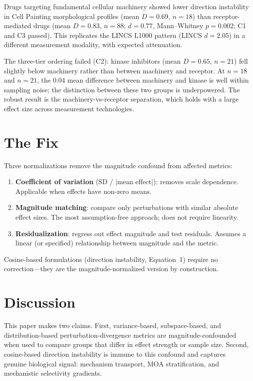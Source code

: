 \documentclass[11pt]{article}
\begin{document}
Drugs targeting fundamental cellular machinery showed lower direction
instability in Cell Painting morphological profiles (mean $D = 0.69$,
$n = 18$) than receptor-mediated drugs (mean $D = 0.83$, $n = 88$;
$d = 0.77$, Mann--Whitney $p = 0.002$; C1 and C3 passed). This
replicates the LINCS L1000 pattern (LINCS $d = 2.05$) in a different
measurement modality, with expected attenuation.

The three-tier ordering failed (C2): kinase inhibitors (mean $D = 0.65$,
$n = 21$) fell slightly below machinery rather than between machinery
and receptor. At $n = 18$ and $n = 21$, the $0.04$ mean difference
between machinery and kinase is well within sampling noise; the
distinction between these two groups is underpowered. The robust result
is the machinery-vs-receptor separation, which holds with a large
effect size across measurement technologies.

\section{The Fix}

Three normalizations remove the magnitude confound from affected
metrics:

\begin{enumerate}
  \item \textbf{Coefficient of variation} (SD / $|\text{mean effect}|$):
    removes scale dependence. Applicable when effects have non-zero means.
  \item \textbf{Magnitude matching}: compare only perturbations with
    similar absolute effect sizes. The most assumption-free approach; does
    not require linearity.
  \item \textbf{Residualization}: regress out effect magnitude and test
    residuals. Assumes a linear (or specified) relationship between
    magnitude and the metric.
\end{enumerate}

Cosine-based formulations (direction instability, Equation~1) require no
correction---they are the magnitude-normalized version by construction.


\section{Discussion}

This paper makes two claims. First, variance-based, subspace-based, and
distribution-based perturbation-divergence metrics are
magnitude-confounded when used to compare groups that differ in effect
strength or sample size. Second, cosine-based direction instability is
immune to this confound and captures genuine biological signal: mechanism
transport, MOA stratification, and mechanistic selectivity gradients.
\end{document}
